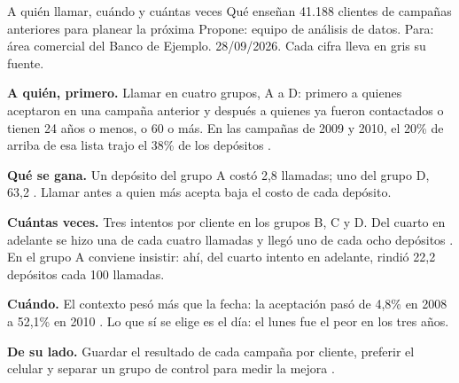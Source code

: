 \documentclass[10pt,a4paper]{article}
\begin{document}
  {A quién llamar, cuándo y cuántas veces}
  {Qué enseñan 41.188 clientes de campañas anteriores para planear la próxima}
  {Propone: equipo de análisis de datos. Para: área comercial del Banco de Ejemplo. 28/09/2026. Cada cifra lleva en gris su fuente.}

\begin{cifras}[4]
\end{cifras}

\resumen[La recomendación]
\textbf{A quién, primero.} Llamar en cuatro grupos, A a D: primero a quienes aceptaron en
una campaña anterior y después a quienes ya fueron contactados o tienen 24 años o menos, o 60
o más. En las campañas de 2009 y 2010, el 20\% de arriba de esa lista trajo el 38\% de los
depósitos .

\textbf{Qué se gana.} Un depósito del grupo A costó 2,8 llamadas; uno del grupo D, 63,2
. Llamar antes a quien más acepta baja el costo de cada depósito.

\textbf{Cuántas veces.} Tres intentos por cliente en los grupos B, C y D. Del cuarto en
adelante se hizo una de cada cuatro llamadas y llegó uno de cada ocho depósitos
. En el grupo A conviene insistir: ahí, del cuarto intento en adelante, rindió
22,2 depósitos cada 100 llamadas.

\textbf{Cuándo.} El contexto pesó más que la fecha: la aceptación pasó de 4,8\% en 2008 a
52,1\% en 2010 . Lo que sí se elige es el día: el lunes fue el peor en los tres
años.

\textbf{De su lado.} Guardar el resultado de cada campaña por cliente, preferir el celular y
separar un grupo de control para medir la mejora .


\end{document}
